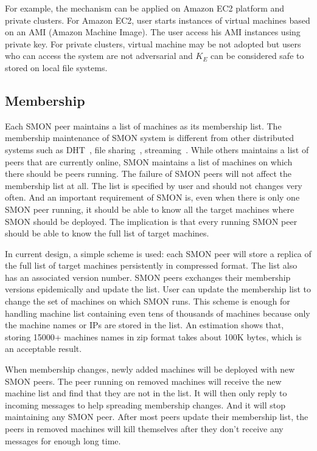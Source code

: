 For example, the mechanism can be applied on Amazon EC2
platform and private clusters. For Amazon EC2, user starts
instances of virtual machines based on an AMI (Amazon
Machine Image). The user access his AMI instances using
private key. For private clusters, virtual machine may be not
adopted but users who can access the system are not
adversarial and $K_E$ can be considered safe to stored on
local file systems.

\subsection{Membership}

Each SMON peer maintains a list of machines as its
membership list.  The membership maintenance of SMON system
is different from other distributed systems such as
DHT~\cite{xxx}, file sharing~\cite{xxx},
streaming~\cite{xxx}. While others maintains a list of peers
that are currently online, SMON maintains a list of machines
on which there should be peers running. The failure of SMON
peers will not affect the membership list at all. The list
is specified by user and should not changes very often. And
an important requirement of SMON is, even when there is only
one SMON peer running, it should be able to know all the
target machines where SMON should be deployed.  The
implication is that every running SMON peer should be able
to know the full list of target machines.

In current design, a simple scheme is used: each SMON peer
will store a replica of the full list of target machines
persistently in compressed format. The list also has an
associated version number. SMON peers exchanges their
membership versions epidemically and update the list. User
can update the membership list to change the set of machines
on which SMON runs.
This scheme is enough for handling machine list containing
even tens of thousands of machines because only the machine
names or IPs are stored in the list.  An estimation shows
that, storing 15000+ machines names in zip format takes
about 100K bytes, which is an acceptable result.

When membership changes, newly added machines will be
deployed with new SMON peers. The peer running on removed
machines will receive the new machine list and find that
they are not in the list. It will then only reply to
incoming messages to help spreading membership changes. And
it will stop maintaining any SMON peer.  After most peers
update their membership list, the peers in removed machines
will kill themselves after they don't receive any messages
for enough long time.

